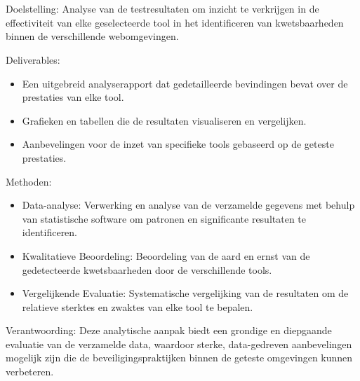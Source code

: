 \section{}
Doelstelling: Analyse van de testresultaten om inzicht te verkrijgen in de effectiviteit van elke geselecteerde tool in het 
identificeren van kwetsbaarheden binnen de verschillende webomgevingen.

Deliverables:
\begin{itemize}
    \item Een uitgebreid analyserapport dat gedetailleerde bevindingen bevat over de prestaties van elke tool.
    \item Grafieken en tabellen die de resultaten visualiseren en vergelijken.
    \item Aanbevelingen voor de inzet van specifieke tools gebaseerd op de geteste prestaties.
\end{itemize}

Methoden:
\begin{itemize}
    \item Data-analyse: Verwerking en analyse van de verzamelde gegevens met behulp van statistische software om patronen en significante resultaten te identificeren.
    \item Kwalitatieve Beoordeling: Beoordeling van de aard en ernst van de gedetecteerde kwetsbaarheden door de verschillende tools.
    \item Vergelijkende Evaluatie: Systematische vergelijking van de resultaten om de relatieve sterktes en zwaktes van elke tool te bepalen.
\end{itemize}

Verantwoording: Deze analytische aanpak biedt een grondige en diepgaande evaluatie van de verzamelde data, waardoor sterke, 
data-gedreven aanbevelingen mogelijk zijn die de beveiligingspraktijken binnen de geteste omgevingen kunnen verbeteren.